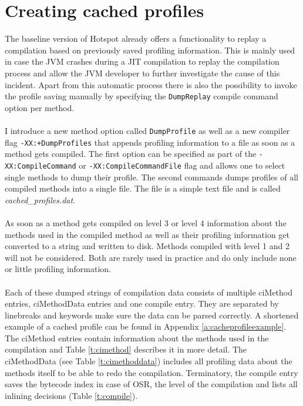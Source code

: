\section{Creating cached profiles}
\label{s:creatingprofiles}
The baseline version of Hotspot already offers a functionality to replay a compilation based on previously saved profiling information.
This is mainly used in case the JVM crashes during a JIT compilation to replay the compilation process and allow the JVM developer to further investigate the cause of this incident.
Apart from this automatic process there is also the possibility to invoke the profile saving manually by specifying the \texttt{DumpReplay} compile command option per method.
\\\\
I introduce a new method option called \texttt{DumpProfile} as well as a new compiler flag \newline\texttt{-XX:+DumpProfiles} that appends profiling information to a file as soon as a method gets compiled. The first option can be specified as part of the \texttt{-XX:CompileCommand} or \texttt{-XX:CompileCommandFile} flag and allows one to select single methods to dump their profile. The second commands dumps profiles of all compiled methods into a single file.
The file is a simple text file and is called \textit{cached\_profiles.dat}.
\\\\
As soon as a method gets compiled on level 3 or level 4 information about the methods used in the compiled method as well as their profiling information get converted to a string and written to disk. Methods compiled with level 1 and 2 will not be considered. Both are rarely used in practice and do only include none or little profiling information.
\\\\
Each of these dumped strings of compilation data consists of multiple ciMethod entries, ciMethodData entries and one compile entry. They are separated by linebreaks and keywords make sure the data can be parsed correctly. A shortened example of a cached profile can be found in Appendix \ref{a:cacheprofileexample}. The ciMethod entries contain information about the methods used in the compilation and Table \ref{t:cimethod} describes it in more detail. The ciMethodData (see Table \ref{t:cimethoddata}) includes all profiling data about the methods itself to be able to redo the compilation.
Terminatory, the compile entry saves the bytecode index in case of OSR, the level of the compilation and lists all inlining decisions (Table \ref{t:compile}).

